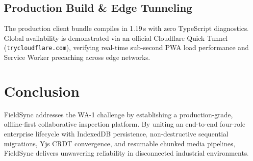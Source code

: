\documentclass[conference]{IEEEtran}
\begin{document}
\subsection{Production Build \& Edge Tunneling}
The production client bundle compiles in 1.19\,s with zero TypeScript diagnostics. Global availability is demonstrated via an official Cloudflare Quick Tunnel (\texttt{trycloudflare.com}), verifying real-time sub-second PWA load performance and Service Worker precaching across edge networks.

\section{Conclusion}
FieldSync addresses the WA-1 challenge by establishing a production-grade, offline-first collaborative inspection platform. By uniting an end-to-end four-role enterprise lifecycle with IndexedDB persistence, non-destructive sequential migrations, Yjs CRDT convergence, and resumable chunked media pipelines, FieldSync delivers unwavering reliability in disconnected industrial environments.



\end{document}
